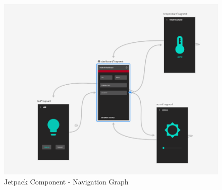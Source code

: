 \begin{figure}
    \centering
    \includegraphics[scale=0.5]{screenshots/navigation_graph.png}
    \caption{Jetpack Component - Navigation Graph}
    \label{fig:navigation-graph}
\end{figure}

